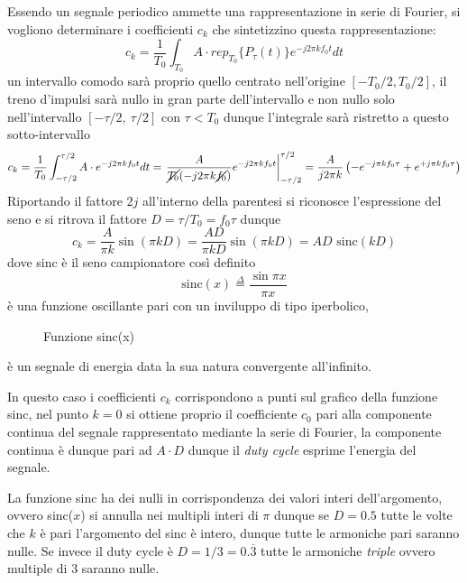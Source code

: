 Essendo un segnale periodico ammette una rappresentazione in serie di Fourier,
si vogliono determinare i coefficienti $c_k$ che sintetizzino questa
rappresentazione:
$$
c_k = \frac{1}{T_0}\int_{T_0} A\cdot rep_{T_0}\{P_\tau(t)\}e^{-j2\pi k f_0 t} dt
$$
un intervallo comodo sarà proprio quello centrato nell'origine $[-T_0/2,
T_0/2]$, il treno d'impulsi sarà nullo in gran parte dell'intervallo e non
nullo solo nell'intervallo $[-\tau/2,\ \tau/2]$ con $\tau<T_0$ dunque
l'integrale sarà ristretto
a questo sotto-intervallo
$$
c_k = \frac{1}{T_0}\int_{-\tau/2}^{\tau/2} A\cdot e^{-j2\pi k f_0 t}dt =
\left.\frac{A}{\cancel{T_0}  (-j2\pi k\cancel{f_0})} e^{-j 2\pi kf_0t}
\right|_{-\tau/2}^{\tau/2} = \frac{A}{j2\pi k } \left( -e^{-j\pi kf_0 \tau} +
e^{+j\pi kf_0 \tau}
\right)
$$
Riportando il fattore $2j$ all'interno della parentesi si riconosce
l'espressione del seno e si ritrova il fattore $D = \tau/T_0 = f_0\tau$
dunque
$$
c_k = \frac{A}{\pi k} \sin(\pi k D) = \frac{AD}{\pi kD} \sin(\pi k D) =  AD
\text{ sinc}(kD)
$$
dove sinc è il seno campionatore così definito
$$
\text{sinc}(x) \stackrel{\Delta}{=} \frac{\sin{\pi x}}{\pi x}
$$
è una funzione oscillante pari con un inviluppo di tipo iperbolico,
\begin{figure}[h]
\centering
{}
  \caption{Funzione sinc(x)}
\end{figure}
è un segnale di energia data la sua natura convergente all'infinito.

In questo caso i coefficienti $c_k$ corrispondono a punti sul grafico della
funzione sinc, nel punto $k=0$ si ottiene proprio il coefficiente $c_0$ pari
alla componente continua del segnale rappresentato mediante la serie di
Fourier, la componente continua è dunque pari ad $A\cdot D$ dunque il
\textit{duty cycle} esprime l'energia del segnale.

La funzione sinc ha dei
nulli in corrispondenza dei valori interi dell'argomento, ovvero sinc($x$) si
annulla nei multipli interi di $\pi$ dunque se $D = 0.5$ tutte le volte che $k$
è pari l'argomento del sinc è intero, dunque tutte le armoniche pari saranno
nulle.
Se invece il duty cycle è $D=1/3 = 0.\overline{3}$ tutte le armoniche
\textit{triple} ovvero multiple di 3 saranno nulle.

